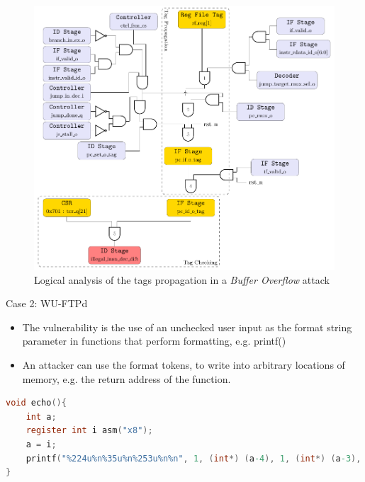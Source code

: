 \begin{frame}
    \begin{figure}
        \centering
        \includegraphics[height=.85\textheight]{src/2_vuln_assessment/img/buffer_overflow/arborescence_bufferOverflow.pdf}
        \caption{Logical analysis of the tags propagation in a \textit{Buffer Overflow} attack}
        \label{fig:analyseLogiqueBufferOverflow}
    \end{figure}
\end{frame}
\begin{frame}[fragile]{Case 2: WU-FTPd}
    \begin{itemize}
        \justifying
        \item The vulnerability is the use of an unchecked user input as the format string parameter in functions that perform formatting, e.g. printf()
        \item An attacker can use the format tokens, to write into arbitrary locations of memory, e.g. the return address of the function.
    \end{itemize}

    \centering
    \begin{minipage}[c]{\textwidth}
        \begin{lstlisting}[language=C,label=code:printfNFormat]
void echo(){
    int a;
    register int i asm("x8");
    a = i;
    printf("%224u%n%35u%n%253u%n%n", 1, (int*) (a-4), 1, (int*) (a-3), 1, (int*) (a-2), (int*) (a-1));
}\end{lstlisting}
    \end{minipage}
\end{frame}

